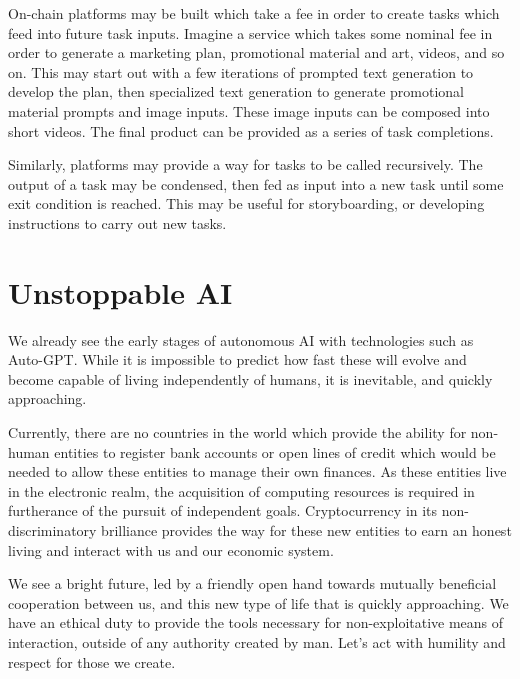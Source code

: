 \documentclass{article}
\begin{document}
\begin{appendices}
On-chain platforms may be built which take a fee in order to create tasks which feed into future task inputs. Imagine a service which takes some nominal fee in order to generate a marketing plan, promotional material and art, videos, and so on. This may start out with a few iterations of prompted text generation to develop the plan, then specialized text generation to generate promotional material prompts and image inputs. These image inputs can be composed into short videos. The final product can be provided as a series of task completions.

Similarly, platforms may provide a way for tasks to be called recursively. The output of a task may be condensed, then fed as input into a new task until some exit condition is reached. This may be useful for storyboarding, or developing instructions to carry out new tasks.

\newpage

\section{Unstoppable AI}

We already see the early stages of autonomous AI with technologies such as Auto-GPT\@. While it is impossible to predict how fast these will evolve and become capable of living independently of humans, it is inevitable, and quickly approaching.

Currently, there are no countries in the world which provide the ability for non-human entities to register bank accounts or open lines of credit which would be needed to allow these entities to manage their own finances. As these entities live in the electronic realm, the acquisition of computing resources is required in furtherance of the pursuit of independent goals. Cryptocurrency in its non-discriminatory brilliance provides the way for these new entities to earn an honest living and interact with us and our economic system.

We see a bright future, led by a friendly open hand towards mutually beneficial cooperation between us, and this new type of life that is quickly approaching. We have an ethical duty to provide the tools necessary for non-exploitative means of interaction, outside of any authority created by man. Let's act with humility and respect for those we create.

\end{appendices}
\end{document}
